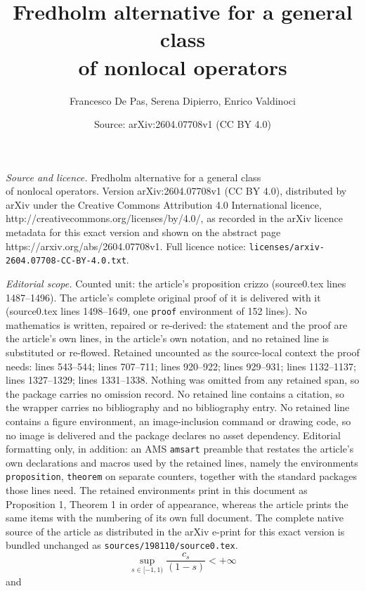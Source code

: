 \documentclass[10pt,a4paper]{amsart}
\title{Fredholm alternative for a general class\\ of nonlocal operators}
\author{Francesco De Pas, Serena Dipierro, Enrico Valdinoci}
\date{Source: arXiv:2604.07708v1 (CC BY 4.0)}
\begin{document}
\maketitle

\noindent\emph{Source and licence.} Fredholm alternative for a general class\\ of nonlocal operators. Version arXiv:2604.07708v1 (CC BY 4.0), distributed by arXiv under the Creative Commons Attribution 4.0 International licence, http://creativecommons.org/licenses/by/4.0/, as recorded in the arXiv licence metadata for this exact version and shown on the abstract page https://arxiv.org/abs/2604.07708v1. Full licence notice: \texttt{licenses/arxiv-2604.07708-CC-BY-4.0.txt}.\par\smallskip

\noindent\textit{Editorial scope.} Counted unit: the article's proposition crizzo (source0.tex lines 1487--1496). The article's complete original proof of it is delivered with it (source0.tex lines 1498--1649, one \texttt{proof} environment of 152 lines). No mathematics is written, repaired or re-derived: the statement and the proof are the article's own lines, in the article's own notation, and no retained line is substituted or re-flowed.  Retained uncounted as the source-local context the proof needs: lines 543--544; lines 707--711; lines 920--922; lines 929--931; lines 1132--1137; lines 1327--1329; lines 1331--1338.  Nothing was omitted from any retained span, so the package carries no omission record.  No retained line contains a citation, so the wrapper carries no bibliography and no bibliography entry.  No retained line contains a figure environment, an image-inclusion command or drawing code, so no image is delivered and the package declares no asset dependency.  Editorial formatting only, in addition: an AMS \texttt{amsart} preamble that restates the article's own declarations and macros used by the retained lines, namely the environments \texttt{proposition}, \texttt{theorem} on separate counters, together with the standard packages those lines need.  The retained environments print in this document as Proposition 1, Theorem 1 in order of appearance, whereas the article prints the same items with the numbering of its own full document.  The complete native source of the article as distributed in the arXiv e-print for this exact version is bundled unchanged as \texttt{sources/198110/source0.tex}.
			\begin{equation}\label{constdef}
\sup_{s \in [-1,1)} \frac{c_s}{(1-s)} < + \infty  \end{equation} and
\end{document}
